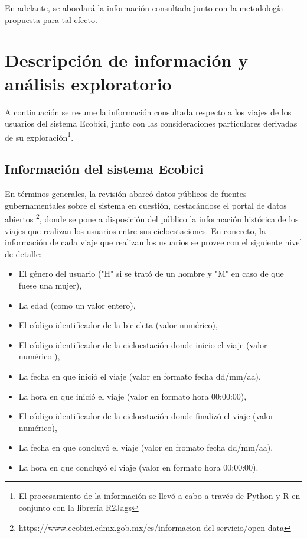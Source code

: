 \documentclass[9pt,twocolumn,twoside]{ilcss}
\begin{document}
En adelante, se abordará la información consultada junto con la metodología propuesta para tal efecto.

\section{Descripción de información y análisis exploratorio}

A continuación se resume la información consultada respecto a los viajes de los usuarios del sistema Ecobici, junto con las consideraciones particulares derivadas de su exploración\footnote{El procesamiento de la información se llevó a cabo a través de Python y R en conjunto con la librería R2Jags}. 

\subsection{Información del sistema Ecobici} 

En términos generales, la revisión abarcó datos públicos 
de fuentes gubernamentales sobre el sistema en cuestión, destacándose el portal de datos abiertos \footnote{https://www.ecobici.cdmx.gob.mx/es/informacion-del-servicio/open-data}, donde se pone a disposición del público la información histórica de los viajes que realizan los usuarios entre sus cicloestaciones. En concreto, la información de cada viaje que realizan los usuarios se provee con el siguiente nivel de detalle:
\begin{itemize}
	\item El género del usuario ("H" si se trató de un hombre y "M" en caso de que fuese una mujer), \vspace{-0.2cm}
	\item La edad (como un valor entero),\vspace{-0.2cm}
	\item El código identificador de la bicicleta (valor numérico),\vspace{-0.2cm}
	\item El código identificador de la cicloestación donde inicio el viaje (valor numérico ),\vspace{-0.2cm}
	\item La fecha en que inició el viaje (valor en formato fecha dd/mm/aa),\vspace{-0.2cm}
	\item La hora en que inició el viaje (valor en formato hora 00:00:00),\vspace{-0.2cm}
	\item El código identificador de la cicloestación donde finalizó el viaje (valor numérico),\vspace{-0.2cm}
	\item La fecha en que concluyó el viaje (valor en fromato fecha dd/mm/aa),\vspace{-0.2cm}
	\item La hora en que concluyó el viaje (valor en formato hora 00:00:00).\vspace{-0.2cm}
\end{itemize}
\end{document}
